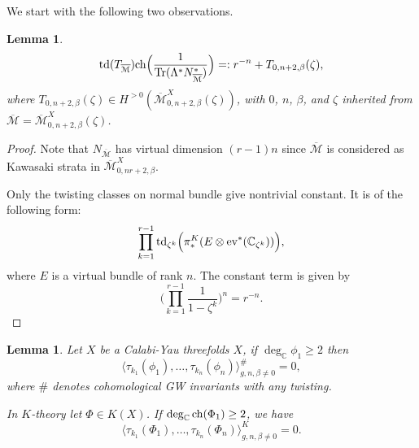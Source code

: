 \documentclass[11pt]{amsart}
\newtheorem{lemma}[theorem]{Lemma}
\newtheorem*{main theorem*}{Main Theorem}
\theoremstyle{remark}
\numberwithin{equation}{section}
\newcommand{\M}{\overline{\mathcal{M}}}
\newcommand{\ev}{{\rm ev}}
\newcommand{\td}{{\rm td}}
\newcommand{\ch}{{\rm ch}}
\newcommand{\Tr}{{\rm Tr}}
\begin{document}
We start with the following two observations.
\begin{lemma} \label{lemma_rpower}
\[
\td (T_{\M}) \ch \Big( \frac{1}{\Tr (\Lambda^* N^*_{\M})} \Big) =: r^{-n} + T_{0,n+2,\beta}(\zeta),
\]
where $T_{0,n+2,\beta}(\zeta)\in H^{>0}(\M^X_{0,n+2,\beta}(\zeta))$, with $0$, $n$, $\beta$, and $\zeta$ inherited from $\M = \M^X_{0,n+2,\beta}(\zeta)$.
\end{lemma}
\begin{proof}
Note that $N_{\M}$ has virtual dimension $(r-1)n$ since $\M$ is considered as Kawasaki strata in $\M^X_{0,nr+2,\beta}$. 

Only the twisting classes on normal bundle give nontrivial constant. It is of the following form:
\[
\prod_{k=1}^{r-1} \td_{\zeta^k} \Big( \pi^K_*(  E \otimes \ev^* (\mathbb{C}_{\zeta^k}) )\Big),
\]
where $E$ is a virtual bundle of rank $n$. The constant term is given by
\[
\Big( \prod_{k=1}^{r-1} \frac{1}{1-\zeta^k} \Big)^n = r^{-n}.
\]

\end{proof}
\begin{lemma} \label{lemma_vanishingdeg2}
Let $X$ be a Calabi-Yau threefolds $X$, if $\deg_{\mathbb{C}} \phi_1 \geq 2$ then
\begin{equation} \label{e:3.1}
\langle \tau_{k_1}(\phi_1),\dots, \tau_{k_n}(\phi_n) \rangle_{g,n,\beta\neq 0}^{\#} =0,
\end{equation}
where $\#$ denotes cohomological GW invariants with any twisting.

In $K$-theory let $\Phi \in K(X)$. If $\deg_{\mathbb{C}} \ch (\Phi_1) \geq 2$, we have
\begin{equation} \label{e:3.2}
    \langle \tau_{k_1}(\Phi_1),\dots, \tau_{k_n}(\Phi_n) \rangle_{g,n,\beta\neq 0}^K =0.
\end{equation}
\end{lemma}
\end{document}
